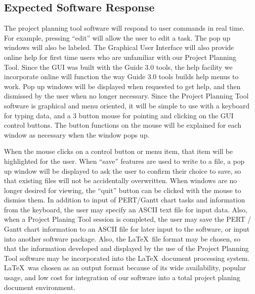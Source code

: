 \subsection{Expected Software Response}

The project planning tool software will respond to user commands in
real time.  For example, pressing ``edit'' will allow the user to edit
a task.  The pop up windows will also be labeled.  The Graphical User
Interface will also provide online help for first time users who are
unfamiliar with our Project Planning Tool.  Since the GUI was built
with the Guide 3.0 tools, the help facility we incorporate online will
function the way Guide 3.0 tools builds help menus to work.  Pop up
windows will be displayed when requested to get help, and then
dismissed by the user when no longer necessary.  Since the Project
Planning Tool software is graphical and menu oriented, it will be
simple to use with a keyboard for typing data, and a 3 button mouse
for pointing and clicking on the GUI control buttons.  The button
functions on the mouse will be explained for each window as necessary
when the window pops up.

When the mouse clicks on a control button or menu item, that item will
be highlighted for the user.  When ``save'' features are used to write
to a file, a pop up window will be displayed to ask the user to
confirm their choice to save, so that existing files will not be
accidentally overwritten.  When windows are no longer desired for
viewing, the ``quit'' button can be clicked with the mouse to dismiss
them.  In addition to input of PERT/Gantt chart tasks and information
from the keyboard, the user may specify an ASCII text file for input
data.  Also, when a Project Planing Tool session is completed, the
user may save the PERT / Gantt chart information to an ASCII file for
later input to the software, or input into another software package.
Also, the \LaTeX\ file format may be chosen, so that the information
developed and displayed by the use of the Project Planning Tool
software may be incorporated into the \LaTeX\ document processing
system.  \LaTeX\ was chosen as an output format because of its wide
availability, popular usage, and low cost for integration of our
software into a total project planing document environment.

